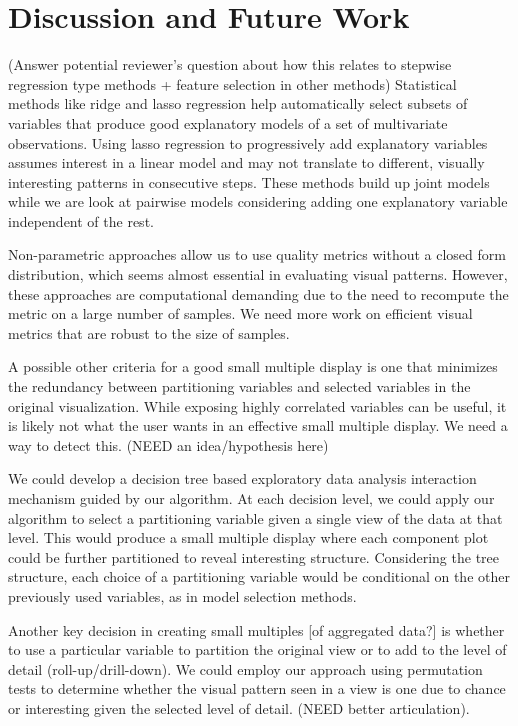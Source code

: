 \section{Discussion and Future Work}
\label{sec:discussion}
(Answer potential reviewer's question about how this relates to stepwise regression type methods + feature selection in other methods)
Statistical methods like ridge and lasso regression help automatically select subsets of variables that produce good explanatory models of a set of multivariate observations. Using lasso regression to progressively add explanatory variables assumes interest in a linear model and may not translate to different, visually interesting  patterns in consecutive steps. These methods build up joint models while we are look at pairwise models considering adding one explanatory variable independent of the rest. 

Non-parametric approaches allow us to use quality metrics without a closed form distribution, which seems almost essential in evaluating visual patterns. However, these approaches are computational demanding due to the need to recompute the metric on a large number of samples. We need more work on efficient visual metrics that are robust to the size of samples.

A possible other criteria for a good small multiple display is one that minimizes the redundancy between partitioning variables and selected variables in the original visualization. While exposing highly correlated variables can be useful, it is likely not what the user wants in an effective small multiple display. We need a way to detect this. (NEED an idea/hypothesis here)

We could develop a decision tree based exploratory data analysis interaction mechanism guided by our algorithm. At each decision level, we could apply our algorithm to select a partitioning variable given a single view of the data at that level. This would produce a small multiple display where each component plot could be further partitioned to reveal interesting structure. Considering the tree structure, each choice of a partitioning variable would be conditional on the other previously used variables, as in model selection methods. 

Another key decision in creating small multiples [of aggregated data?] is whether to use a particular variable to partition the original view or to add to the level of detail (roll-up/drill-down). We could employ our approach using permutation tests  to determine whether the visual pattern seen in a view is one due to chance or interesting given the selected level of detail. (NEED better articulation).


